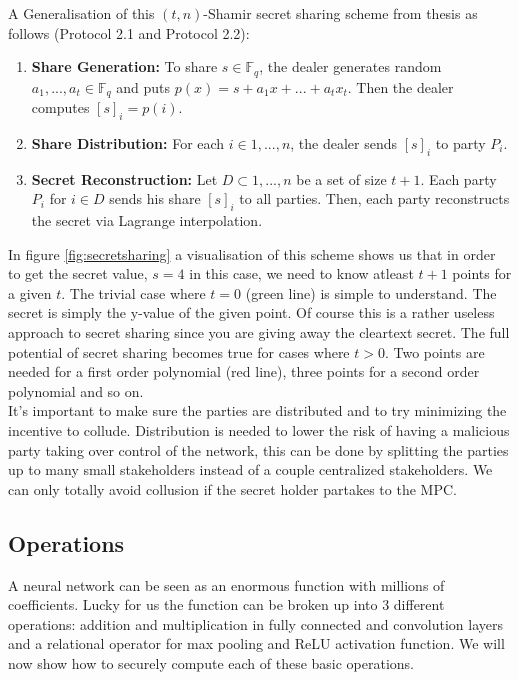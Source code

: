 A Generalisation of this $(t,n)$-Shamir secret sharing scheme from thesis \cite{de2012design} as follows (Protocol 2.1 and Protocol 2.2):
\begin{enumerate}
  \item \textbf{Share Generation:} To share $s \in \mathbb{F}_q$, the dealer generates random $a_1, ..., a_t \in \mathbb{F}_q$ and puts $p(x) = s + a_1x + ... + a_tx_t$. Then the dealer computes $[s]_i = p(i)$.
  \item \textbf{Share Distribution:} For each $i \in {1, ..., n}$, the dealer sends $[s]_i$ to party $P_i$.
  \item \textbf{Secret Reconstruction:} Let $D \subset {1, ..., n}$ be a set of size $t + 1$. Each party $P_i$ for $i \in D$ sends his share $[s]_i$ to all parties. Then, each party reconstructs the secret via Lagrange interpolation.
\end{enumerate}
In figure \ref{fig:secretsharing} a visualisation of this scheme shows us that in order to get the secret value, $s=4$ in this case, we need to know atleast $t+1$ points for a given $t$. The trivial case where $t=0$ (green line) is simple to understand. The secret is simply the y-value of the given point. Of course this is a rather useless approach to secret sharing since you are giving away the cleartext secret. The full potential of secret sharing becomes true for cases where $t>0$. Two points are needed for a first order polynomial (red line), three points for a second order polynomial and so on.\\
It's important to make sure the parties are distributed and to try minimizing the incentive to collude. Distribution is needed to lower the risk of having a malicious party taking over control of the network, this can be done by splitting the parties up to many small stakeholders instead of a couple centralized stakeholders. We can only totally avoid collusion if the secret holder partakes to the MPC.

\subsection{Operations}
A neural network can be seen as an enormous function with millions of coefficients. Lucky for us the function can be broken up into 3 different operations: addition and multiplication in fully connected and convolution layers and a relational operator for max pooling and ReLU activation function. We will now show how to securely compute each of these basic operations.

